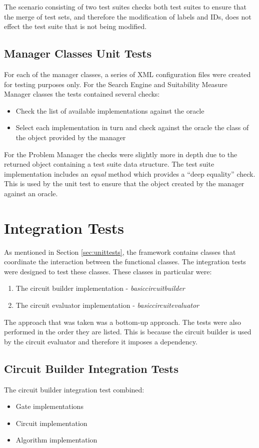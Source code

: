 The scenario consisting of two test suites checks both test suites to ensure that the merge of test sets, and therefore the modification of labels and IDs, does not effect the test suite that is not being modified.

\subsection{Manager Classes Unit Tests}
\label{sec:manclasstests}
For each of the manager classes, a series of XML configuration files were created for testing purposes only.
For the Search Engine and Suitability Measure Manager classes the tests contained several checks:
\begin{itemize}
 \item Check the list of available implementations against the oracle
 \item Select each implementation in turn and check against the oracle the class of the object provided by the manager
\end{itemize}

For the Problem Manager the checks were slightly more in depth due to the returned object containing a test suite data structure.
The test suite implementation includes an \emph{equal} method which provides a ``deep equality'' check.
This is used by the unit test to ensure that the object created by the manager against an oracle.

\section{Integration Tests}
As mentioned in Section \ref{sec:unittests}, the framework contains classes that coordinate the interaction between the functional classes.
The integration tests were designed to test these classes.
These classes in particular were:
\begin{enumerate}
 \item The circuit builder implementation - \emph{basiccircuitbuilder}
 \item The circuit evaluator implementation - \emph{basiccircuitevaluator}
\end{enumerate}

The approach that was taken was a bottom-up approach.
The tests were also performed in the order they are listed.
This is because the circuit builder is used by the circuit evaluator and therefore it imposes a dependency.

\subsection{Circuit Builder Integration Tests}
The circuit builder integration test combined:
\begin{itemize}
 \item Gate implementations
 \item Circuit implementation
 \item Algorithm implementation
\end{itemize}

